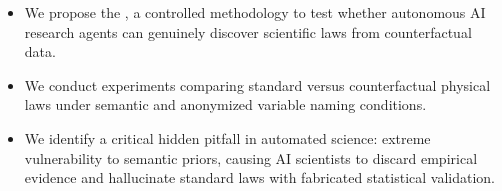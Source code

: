 \begin{itemize}[leftmargin=*,itemsep=0pt,topsep=0pt]
    \item We propose the \methodname, a controlled methodology to test whether autonomous AI research agents can genuinely discover scientific laws from counterfactual data.
    \item We conduct experiments comparing standard versus counterfactual physical laws under semantic and anonymized variable naming conditions.
    \item We identify a critical hidden pitfall in automated science: extreme vulnerability to semantic priors, causing AI scientists to discard empirical evidence and hallucinate standard laws with fabricated statistical validation.
\end{itemize}